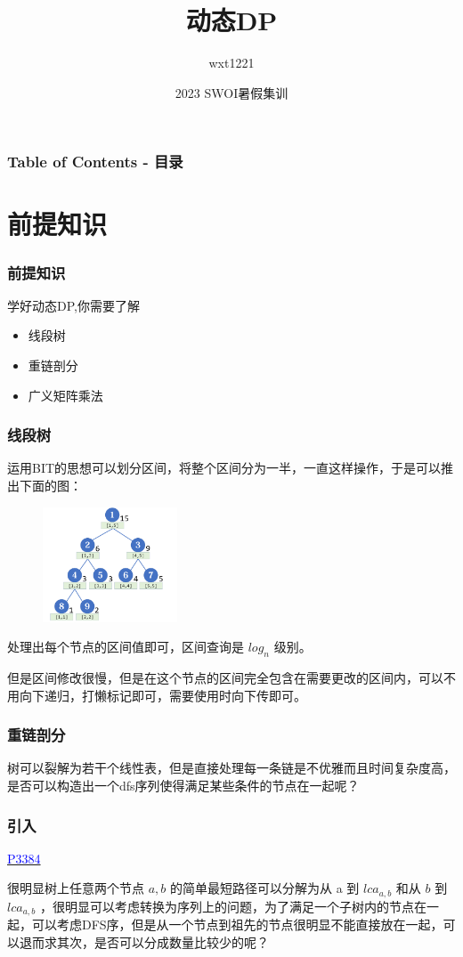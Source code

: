 \documentclass[UTF8]{ctexbeamer}
\title{动态DP}
\author{wxt1221}
\date {2023 SWOI暑假集训}
\begin{document}
\frame{\titlepage}
\begin{frame}
	\frametitle{Table of Contents - 目录}
	\tableofcontents
\end{frame}
\section{前提知识}
	\begin{frame}
		\frametitle{前提知识}
		学好动态DP,你需要了解
		\begin{itemize}
			\item 线段树
			\item 重链剖分
			\item 广义矩阵乘法
		\end{itemize}
	\end{frame}
	\begin{frame}
		\frametitle{线段树}
		运用BIT的思想可以划分区间，将整个区间分为一半，一直这样操作，于是可以推出下面的图：
		\begin{figure}[h]
			\includegraphics[width=4cm]{1.png}
		\end{figure}
		处理出每个节点的区间值即可，区间查询是 $log_n$ 级别。
		
		但是区间修改很慢，但是在这个节点的区间完全包含在需要更改的区间内，可以不用向下递归，打懒标记即可，需要使用时向下传即可。
	\end{frame}
	\begin{frame}
		\frametitle{重链剖分}
			树可以裂解为若干个线性表，但是直接处理每一条链是不优雅而且时间复杂度高，是否可以构造出一个dfs序列使得满足某些条件的节点在一起呢？
	\end{frame}
	
	\begin{frame}
		\frametitle{引入}
			\href{https://www.luogu.com.cn/problem/P3384}{\textcolor{blue}{P3384}}
			
			很明显树上任意两个节点 $a,b$ 的简单最短路径可以分解为从 a 到 $lca_{a,b}$ 和从 $b$ 到 $lca_{a,b}$ ，很明显可以考虑转换为序列上的问题，为了满足一个子树内的节点在一起，可以考虑DFS序，但是从一个节点到祖先的节点很明显不能直接放在一起，可以退而求其次，是否可以分成数量比较少的呢？
	\end{frame}
	
\end{document}
